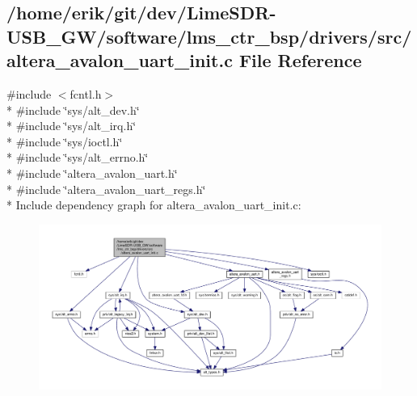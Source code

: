\subsection{/home/erik/git/dev/\+Lime\+S\+D\+R-\/\+U\+S\+B\+\_\+\+G\+W/software/lms\+\_\+ctr\+\_\+bsp/drivers/src/altera\+\_\+avalon\+\_\+uart\+\_\+init.c File Reference}
\label{altera__avalon__uart__init_8c}
{\ttfamily \#include $<$fcntl.\+h$>$}\\*
{\ttfamily \#include \char`\"{}sys/alt\+\_\+dev.\+h\char`\"{}}\\*
{\ttfamily \#include \char`\"{}sys/alt\+\_\+irq.\+h\char`\"{}}\\*
{\ttfamily \#include \char`\"{}sys/ioctl.\+h\char`\"{}}\\*
{\ttfamily \#include \char`\"{}sys/alt\+\_\+errno.\+h\char`\"{}}\\*
{\ttfamily \#include \char`\"{}altera\+\_\+avalon\+\_\+uart.\+h\char`\"{}}\\*
{\ttfamily \#include \char`\"{}altera\+\_\+avalon\+\_\+uart\+\_\+regs.\+h\char`\"{}}\\*
Include dependency graph for altera\+\_\+avalon\+\_\+uart\+\_\+init.\+c\+:
\nopagebreak
\begin{figure}[H]
\begin{center}
\leavevmode
\includegraphics[width=350pt]{de/d1f/altera__avalon__uart__init_8c__incl}
\end{center}
\end{figure}
